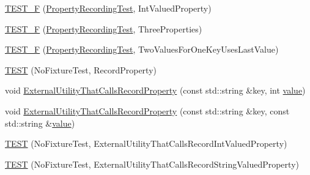 \begin{DoxyCompactItemize}
\item 
\mbox{\hyperlink{_obj__test_2lib_2googletest-release-1_88_81_2googletest_2test_2gtest__xml__output__unittest___8cc_adb1f852fc00cf0ee498bdfeda3063904}{T\+E\+S\+T\+\_\+F}} (\mbox{\hyperlink{class_property_recording_test}{Property\+Recording\+Test}}, Int\+Valued\+Property)
\item 
\mbox{\hyperlink{_obj__test_2lib_2googletest-release-1_88_81_2googletest_2test_2gtest__xml__output__unittest___8cc_ae2e5aa08a79eb9b086a145cc06accfc5}{T\+E\+S\+T\+\_\+F}} (\mbox{\hyperlink{class_property_recording_test}{Property\+Recording\+Test}}, Three\+Properties)
\item 
\mbox{\hyperlink{_obj__test_2lib_2googletest-release-1_88_81_2googletest_2test_2gtest__xml__output__unittest___8cc_a261de6777fb791a7556366e938ddb98a}{T\+E\+S\+T\+\_\+F}} (\mbox{\hyperlink{class_property_recording_test}{Property\+Recording\+Test}}, Two\+Values\+For\+One\+Key\+Uses\+Last\+Value)
\item 
\mbox{\hyperlink{_obj__test_2lib_2googletest-release-1_88_81_2googletest_2test_2gtest__xml__output__unittest___8cc_ab78e993a01acfc3e6b0b879351a1e679}{T\+E\+ST}} (No\+Fixture\+Test, Record\+Property)
\item 
void \mbox{\hyperlink{_obj__test_2lib_2googletest-release-1_88_81_2googletest_2test_2gtest__xml__output__unittest___8cc_a8a5eb3769c1d7482bf69f3a03862c6a6}{External\+Utility\+That\+Calls\+Record\+Property}} (const std\+::string \&key, int \mbox{\hyperlink{_obj__test_2lib_2googletest-master_2googlemock_2test_2gmock-matchers__test_8cc_a337b8a670efc0b086ad3af163f3121b6}{value}})
\item 
void \mbox{\hyperlink{_obj__test_2lib_2googletest-release-1_88_81_2googletest_2test_2gtest__xml__output__unittest___8cc_a88d769551f5ca79a6668f6ef64a1abdd}{External\+Utility\+That\+Calls\+Record\+Property}} (const std\+::string \&key, const std\+::string \&\mbox{\hyperlink{_obj__test_2lib_2googletest-master_2googlemock_2test_2gmock-matchers__test_8cc_a337b8a670efc0b086ad3af163f3121b6}{value}})
\item 
\mbox{\hyperlink{_obj__test_2lib_2googletest-release-1_88_81_2googletest_2test_2gtest__xml__output__unittest___8cc_abe7f5c93beecd6501a7b6ccf838f5b10}{T\+E\+ST}} (No\+Fixture\+Test, External\+Utility\+That\+Calls\+Record\+Int\+Valued\+Property)
\item 
\mbox{\hyperlink{_obj__test_2lib_2googletest-release-1_88_81_2googletest_2test_2gtest__xml__output__unittest___8cc_aabb1993df586239008c66c29009a8b72}{T\+E\+ST}} (No\+Fixture\+Test, External\+Utility\+That\+Calls\+Record\+String\+Valued\+Property)

\end{DoxyCompactItemize}
